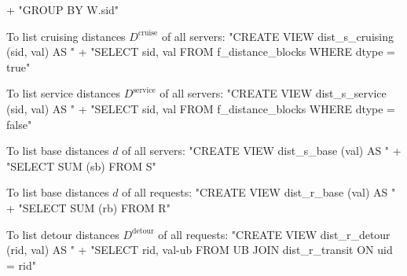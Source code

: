 \documentclass{article}
\def\nwendcode{\endtrivlist \endgroup}
\let\nwdocspar=\par
\theoremstyle{definition}
\begin{document}
  + "GROUP BY W.sid"
\nwendcode{}\nwdocspar
To list cruising distances $D^\textrm{cruise}$ of all servers:
\nwenddocs{}\endmoddef{}
"CREATE VIEW dist_s_cruising (sid, val) AS "
  + "SELECT sid, val FROM f_distance_blocks WHERE dtype = true"
\nwendcode{}\nwdocspar
To list service distances $D^\textrm{service}$ of all servers:
\nwenddocs{}\endmoddef{}
"CREATE VIEW dist_s_service (sid, val) AS "
  + "SELECT sid, val FROM f_distance_blocks WHERE dtype = false"
\nwendcode{}\nwdocspar
To list base distances $d$ of all servers:
\nwenddocs{}\endmoddef{}
"CREATE VIEW dist_s_base (val) AS "
  + "SELECT SUM (sb) FROM S"
\nwendcode{}\nwdocspar
To list base distances $d$ of all requests:
\nwenddocs{}\endmoddef{}
"CREATE VIEW dist_r_base (val) AS "
  + "SELECT SUM (rb) FROM R"
\nwendcode{}\nwdocspar
To list detour distances $D^\textrm{detour}$ of all requests:
\nwenddocs{}\endmoddef{}
"CREATE VIEW dist_r_detour (rid, val) AS "
  + "SELECT rid, val-ub FROM UB JOIN dist_r_transit ON uid = rid"
\nwendcode{}\nwdocspar
\end{document}

